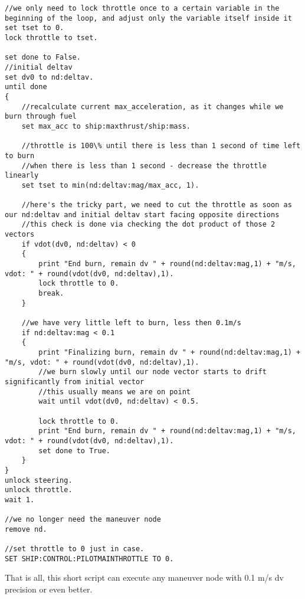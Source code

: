 \begin{Verbatim}[frame=single]
//we only need to lock throttle once to a certain variable in the beginning of the loop, and adjust only the variable itself inside it
set tset to 0.
lock throttle to tset.

set done to False.
//initial deltav
set dv0 to nd:deltav.
until done
{
    //recalculate current max_acceleration, as it changes while we burn through fuel
    set max_acc to ship:maxthrust/ship:mass.

    //throttle is 100\% until there is less than 1 second of time left to burn
    //when there is less than 1 second - decrease the throttle linearly
    set tset to min(nd:deltav:mag/max_acc, 1).

    //here's the tricky part, we need to cut the throttle as soon as our nd:deltav and initial deltav start facing opposite directions
    //this check is done via checking the dot product of those 2 vectors
    if vdot(dv0, nd:deltav) < 0
    {
        print "End burn, remain dv " + round(nd:deltav:mag,1) + "m/s, vdot: " + round(vdot(dv0, nd:deltav),1).
        lock throttle to 0.
        break.
    }

    //we have very little left to burn, less then 0.1m/s
    if nd:deltav:mag < 0.1
    {
        print "Finalizing burn, remain dv " + round(nd:deltav:mag,1) + "m/s, vdot: " + round(vdot(dv0, nd:deltav),1).
        //we burn slowly until our node vector starts to drift significantly from initial vector
        //this usually means we are on point
        wait until vdot(dv0, nd:deltav) < 0.5.

        lock throttle to 0.
        print "End burn, remain dv " + round(nd:deltav:mag,1) + "m/s, vdot: " + round(vdot(dv0, nd:deltav),1).
        set done to True.
    }
}
unlock steering.
unlock throttle.
wait 1.

//we no longer need the maneuver node
remove nd.

//set throttle to 0 just in case.
SET SHIP:CONTROL:PILOTMAINTHROTTLE TO 0.
\end{Verbatim} 

That is all, this short script can execute any maneuver node with 0.1 m/s dv precision or even better.